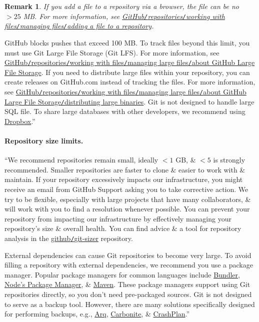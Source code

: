 \documentclass[oneside]{book}
\numberwithin{equation}{section}
\newtheorem{remark}{Remark}[section]
\begin{document}
\begin{remark}
	If you add a file to a repository via a browser, the file can be no $> 25$ MB. For more information, see \href{https://docs.github.com/en/repositories/working-with-files/managing-files/adding-a-file-to-a-repository}{GitHub\texttt{/}repositories\texttt{/}working with files\texttt{/}managing files\texttt{/}adding a file to a repository}.
\end{remark}
GitHub blocks pushes that exceed 100 MB. To track files beyond this limit, you must use Git Large File Storage (Git LFS). For more information, see \href{https://docs.github.com/en/repositories/working-with-files/managing-large-files/about-git-large-file-storage}{GitHub\texttt{/}repositories\texttt{/}working with files\texttt{/}managing large files\texttt{/}about GitHub Large File Storage}. If you need to distribute large files within your repository, you can create releases on GitHub.com instead of tracking the files. For more information, see \href{https://docs.github.com/en/repositories/working-with-files/managing-large-files/about-large-files-on-github#distributing-large-binaries}{GitHub\texttt{/}repositories\texttt{/}working with files\texttt{/}managing large files\texttt{/}about GitHub Large File Storage\texttt{/}distributing large binaries}. Git is not designed to handle large SQL file. To share large databases with other developers, we recommend using \href{https://www.dropbox.com/}{Dropbox}.''

\paragraph{Repository size limits.} ``We recommend repositories remain small, ideally $< 1$ GB, \& $< 5$ is strongly recommended. Smaller repositories are faster to clone \& easier to work with \& maintain. If your repository excessively impacts our infrastructure, you might receive an email from GitHub Support asking you to take corrective action. We try to be flexible, especially with large projects that have many collaborators, \& will work with you to find a resolution whenever possible. You can prevent your repository from impacting our infrastructure by effectively managing your repository's size \& overall health. You can find advice \& a tool for repository analysis in the \href{https://github.com/github/git-sizer}{github\texttt{/}git-sizer} repository.

External dependencies can cause Git repositories to become very large. To avoid filling a repository with external dependencies, we recommend you use a package manager. Popular package managers for common languages include \href{http://bundler.io/}{Bundler}, \href{http://npmjs.org/}{Node's Package Manager}, \& \href{http://maven.apache.org/}{Maven}. These package managers support using Git repositories directly, so you don't need pre-packaged sources. Git is not designed to serve as a backup tool. However, there are many solutions specifically designed for performing backups, e.g., \href{https://www.arqbackup.com/}{Arq}, \href{http://www.carbonite.com/}{Carbonite}, \& \href{https://www.crashplan.com/en-us/}{CrashPlan}.''
\end{document}
